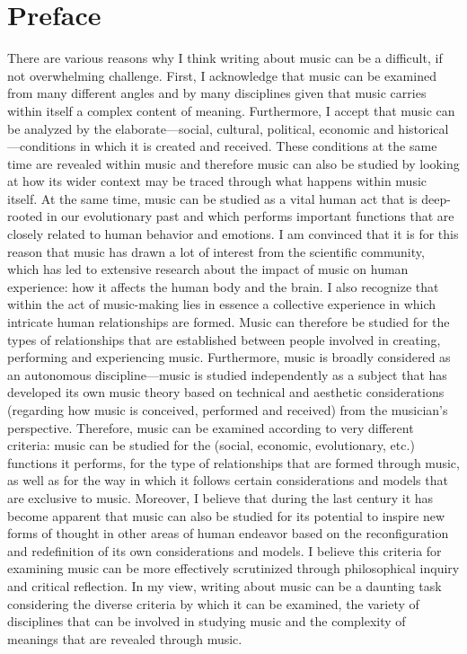 \chapter*{Preface}

There are various reasons why I think writing about music can be a difficult, if not overwhelming challenge. First, I acknowledge that music can be examined from many different angles and by many disciplines given that music carries within itself a complex content of meaning. Furthermore, I accept that music can be analyzed by the elaborate---social, cultural, political, economic and historical---conditions in which it is created and received. These conditions at the same time are revealed within music and therefore music can also be studied by looking at how its wider context may be traced through what happens within music itself. At the same time, music can be studied as a vital human act that is deep-rooted in our evolutionary past and which performs important functions that are closely related to human behavior and emotions. I am convinced that it is for this reason that music has drawn a lot of interest from the scientific community, which has led to extensive research about the impact of music on human experience: how it affects the human body and the brain. I also recognize that within the act of music-making lies in essence a collective experience in which intricate human relationships are formed. Music can therefore be studied for the types of relationships that are established between people involved in creating, performing and experiencing music. Furthermore, music is broadly considered as an autonomous discipline---music is studied independently as a subject that has developed its own music theory based on technical and aesthetic considerations (regarding how music is conceived, performed and received) from the musician's perspective. Therefore, music can be examined according to very different criteria: music can be studied for the (social, economic, evolutionary, etc.) functions it performs, for the type of relationships that are formed through music, as well as for the way in which it follows certain considerations and models that are exclusive to music. Moreover, I believe that during the last century it has become apparent that music can also be studied for its potential to inspire new forms of thought in other areas of human endeavor based on the reconfiguration and redefinition of its own considerations and models. I believe this criteria for examining music can be more effectively scrutinized through philosophical inquiry and critical reflection. In my view, writing about music can be a daunting task considering the diverse criteria by which it can be examined, the variety of disciplines that can be involved in studying music and the complexity of meanings that are revealed through music.

